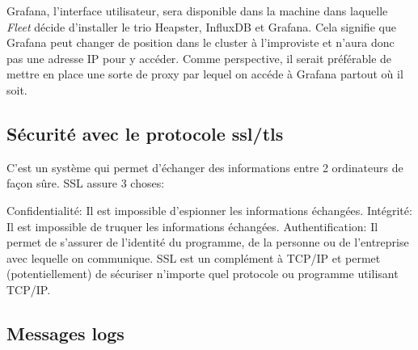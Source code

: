 \begin{onehalfspace}
Grafana, l'interface utilisateur, sera disponible dans la machine dans laquelle \emph{Fleet} décide d'installer le trio Heapster, InfluxDB et Grafana. Cela signifie que Grafana peut changer de position dans le cluster à l'improviste et n'aura donc pas une adresse IP pour y accéder. Comme perspective, il serait préférable de mettre en place une sorte de proxy par lequel on accéde à Grafana partout où il soit.

\subsection{Sécurité avec le protocole \acrshort{ssl}/\acrshort{tls}}

C'est un système qui permet d'échanger des informations entre 2 ordinateurs de façon sûre. SSL assure 3 choses:

Confidentialité: Il est impossible d'espionner les informations échangées.
Intégrité: Il est impossible de truquer les informations échangées.
Authentification: Il permet de s'assurer de l'identité du programme, de la personne ou de l'entreprise avec lequelle on communique.
SSL est un complément à TCP/IP et permet (potentiellement) de sécuriser n'importe quel protocole ou programme utilisant TCP/IP.

\subsection{Messages logs}




\end{onehalfspace}
